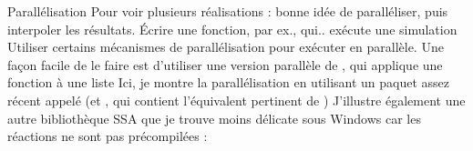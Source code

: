\documentclass[aspectratio=169]{beamer}\usepackage[]{graphicx}\usepackage[]{xcolor}
\begin{document}
\begin{frame}{Parallélisation}
    Pour voir plusieurs réalisations : bonne idée de paralléliser, puis interpoler les résultats. Écrire une fonction, par ex.,  qui.. exécute une simulation
    \vfill
    Utiliser certains mécanismes de parallélisation pour exécuter  en parallèle. Une façon facile de le faire est d'utiliser une version parallèle de , qui applique une fonction à une liste
    \vfill
    Ici, je montre la parallélisation en utilisant un paquet assez récent appelé  (et , qui contient l'équivalent pertinent de )
    \vfill
    J'illustre également une autre bibliothèque SSA que je trouve moins délicate sous Windows car les réactions ne sont pas précompilées : 
\end{frame}
\end{document}
